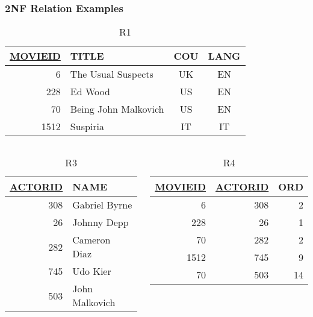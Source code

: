 \documentclass[dvipsnames]{beamer}
\begin{document}
\begin{frame}[label=example_db_2]
  \frametitle{2NF Relation Examples}

  \vspace{-12pt}
  \begin{center}
    \begin{footnotesize}
    \begin{table}
      \caption{R1}
      \begin{tabular}{|r|l|c|c|}\hline
\underline{MOVIEID} & TITLE    & COU & LANG\\[2pt]\hline\hline
      6 & The Usual Suspects   & UK  &  EN \\\hline
    228 & Ed Wood              & US  &  EN \\\hline
     70 & Being John Malkovich & US  &  EN \\\hline
   1512 & Suspiria             & IT  &  IT \\\hline
      \end{tabular}
    \end{table}
    \end{footnotesize}
  \end{center}

  \vspace{-12pt}
  \begin{columns}[t]
    \begin{footnotesize}
    \begin{table}
      \caption{R3}
      \begin{tabular}{|r|l|}\hline
\underline{ACTORID} & NAME\\[2pt]\hline\hline
     308 & Gabriel Byrne \\\hline
      26 & Johnny Depp   \\\hline
     282 & Cameron Diaz  \\\hline
     745 & Udo Kier      \\\hline
     503 & John Malkovich\\\hline
      \end{tabular}
    \end{table}
    \end{footnotesize}

    \begin{footnotesize}
    \begin{table}
      \caption{R4}
      \begin{tabular}{|r|r|r|}\hline
\underline{MOVIEID} & \underline{ACTORID} & ORD\\[2pt]\hline\hline
   6 & 308 &  2\\\hline
 228 &  26 &  1\\\hline
  70 & 282 &  2\\\hline
1512 & 745 &  9\\\hline
  70 & 503 & 14\\\hline
      \end{tabular}
    \end{table}
    \end{footnotesize}
  \end{columns}
\end{frame}
\end{document}
